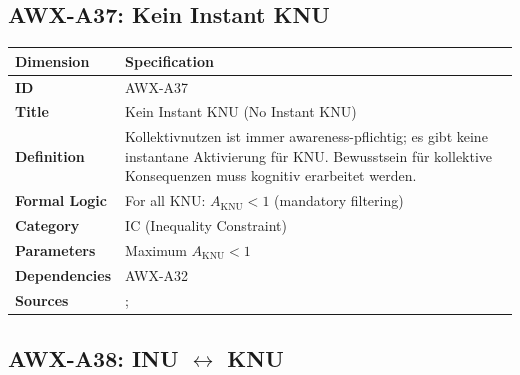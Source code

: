 
\subsection{AWX-A37: Kein Instant KNU}

\begin{table}[htbp]
\small
\begin{tabular}{p{3cm}p{11cm}}
\toprule
\textbf{Dimension} & \textbf{Specification} \\
\midrule
\textbf{ID} & AWX-A37 \\
\textbf{Title} & Kein Instant KNU (No Instant KNU) \\
\textbf{Definition} & Kollektivnutzen ist immer awareness-pflichtig; es gibt keine instantane Aktivierung für KNU. Bewusstsein für kollektive Konsequenzen muss kognitiv erarbeitet werden. \\
\textbf{Formal Logic} & For all KNU: $A_{\text{KNU}} < 1$ (mandatory filtering) \\
\textbf{Category} & IC (Inequality Constraint) \\
\textbf{Parameters} & Maximum $A_{\text{KNU}} < 1$ \\
\textbf{Dependencies} & AWX-A32 \\
\textbf{Sources} & \citet{PAP-fehr2004social}; \citet{ostrom1990governing} \\
\bottomrule
\end{tabular}
\end{table}


\subsection{AWX-A38: INU $\leftrightarrow$ KNU}

